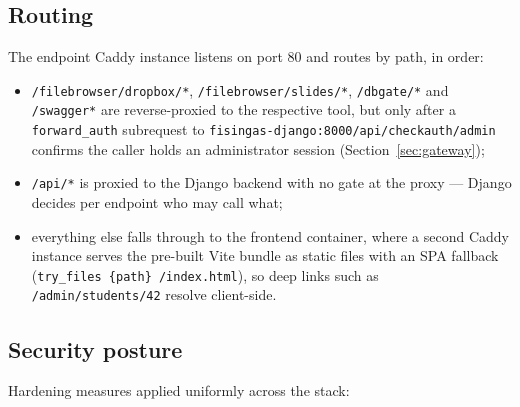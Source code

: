 \documentclass[11pt,a4paper]{article}
\newcommand{\code}[1]{\texttt{#1}}
\begin{document}
\subsection{Routing}

The endpoint Caddy instance listens on port 80 and routes by path, in
order:

\begin{itemize}
  \item \code{/filebrowser/dropbox/*}, \code{/filebrowser/slides/*},
        \code{/dbgate/*} and \code{/swagger*} are reverse-proxied to
        the respective tool, but only after a \code{forward\_auth}
        subrequest to \code{fisingas-django:8000\allowbreak/api/checkauth/admin}
        confirms the caller holds an administrator session
        (Section~\ref{sec:gateway});
  \item \code{/api/*} is proxied to the Django backend with no gate at
        the proxy --- Django decides per endpoint who may call what;
  \item everything else falls through to the frontend container,
        where a second Caddy instance serves the pre-built Vite bundle
        as static files with an SPA fallback
        (\code{try\_files \{path\} /index.html}), so deep links such
        as \code{/admin/students/42} resolve client-side.
\end{itemize}

\subsection{Security posture}
\label{sec:posture}

Hardening measures applied uniformly across the stack:
\end{document}
